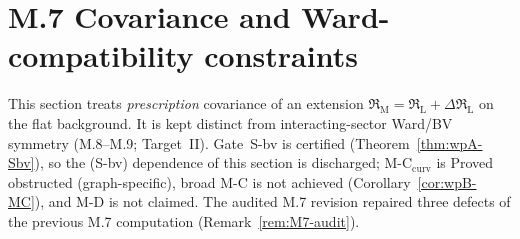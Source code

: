 \documentclass{article}
\theoremstyle{remark}
\newcommand{\RL}{\mathfrak R_{\mathrm L}}
\newcommand{\RM}{\mathfrak R_{\mathrm M}}
\begin{document}
\section{M.7 Covariance and Ward-compatibility constraints}
\label{sec:m7}

This section treats \emph{prescription} covariance of an extension $\RM=\RL+\Delta\RL$ on the flat background.
It is kept distinct from interacting-sector Ward/BV symmetry (M.8--M.9; Target~II).
Gate~S-bv is certified (Theorem~\ref{thm:wpA-Sbv}), so the (S-bv) dependence of this section is discharged; M-C$_{\mathrm{curv}}$ is Proved obstructed (graph-specific), broad M-C is not achieved (Corollary~\ref{cor:wpB-MC}), and M-D is not claimed.
The audited M.7 revision repaired three defects of the previous M.7 computation (Remark~\ref{rem:M7-audit}).
\end{document}

